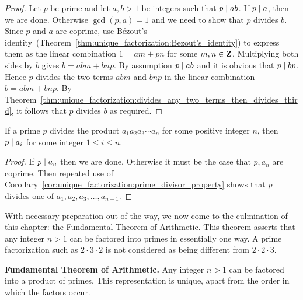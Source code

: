 \begin{proof}
Let $p$ be prime and let $a,b > 1$ be integers such that
$p \;|\; ab$. If $p \;|\; a$, then we are done. Otherwise
$\gcd(p,a) = 1$ and we need to show that $p$ divides $b$. Since $p$
and $a$ are coprime, use B\'ezout's
identity~(Theorem~\ref{thm:unique_factorization:Bezout's_identity})
 to express them as the linear combination
$1 = am + pn$ for some $m,n \in \mathbf{Z}$. Multiplying both sides by $b$
gives $b = abm + bnp$. By assumption $p \;|\; ab$ and it is obvious
that $p \;|\; bp$. Hence $p$ divides the two terms $abm$ and $bnp$
in the linear combination $b = abm + bnp$. By
Theorem~\ref{thm:unique_factorization:divides_any_two_terms_then_divides_third},
it follows that $p$ divides $b$ as required.
\end{proof}

\begin{corollary}
\label{cor:unique_factorization:divides_product_then_divides_one_term}
If a prime $p$ divides the product $a_1 a_2 a_3 \cdots a_n$ for some
positive integer $n$, then $p \;|\; a_i$ for some integer
$1 \leq i \leq n$.
\end{corollary}

\begin{proof}
If $p \;|\; a_{n}$ then we are done. Otherwise it must be the case
that $p, a_n$ are coprime. Then repeated use of
Corollary~\ref{cor:unique_factorization:prime_divisor_property}
shows that $p$ divides one of
$a_1, a_2, a_3, \dots, a_{n-1}$.
\end{proof}

With necessary preparation out of the way, we now come to the
culmination of this chapter: the Fundamental Theorem of
Arithmetic. This theorem
asserts that any integer $n > 1$ can be factored into primes in
essentially one way. A prime factorization such as
$2 \cdot 3 \cdot 2$ is not considered as being different from
$2 \cdot 2 \cdot 3$.

\begin{theorem}
\label{thm:unique_factorization:Fundamental_Theorem_Arithmetic}
\textbf{Fundamental Theorem of Arithmetic.}
Any integer $n > 1$ can be factored into a product of primes. This
representation is unique, apart from the order in which the factors
occur.
\end{theorem}

